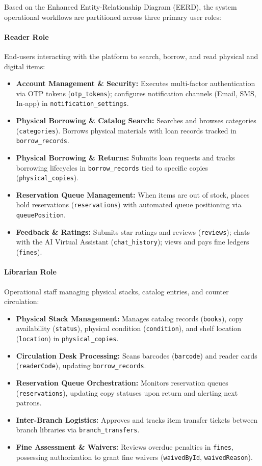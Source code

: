 Based on the Enhanced Entity-Relationship Diagram (EERD), the system operational workflows are partitioned across three primary user roles:

\paragraph{Reader Role}
End-users interacting with the platform to search, borrow, and read physical and digital items:
\begin{itemize}
	\item \textbf{Account Management \& Security:} Executes multi-factor authentication via OTP tokens (\texttt{otp\_tokens}); configures notification channels (Email, SMS, In-app) in \texttt{notification\_settings}.
	\item \textbf{Physical Borrowing \& Catalog Search:} Searches and browses categories (\texttt{categories}). Borrows physical materials with loan records tracked in \texttt{borrow\_records}.
	\item \textbf{Physical Borrowing \& Returns:} Submits loan requests and tracks borrowing lifecycles in \texttt{borrow\_records} tied to specific copies (\texttt{physical\_copies}).
	\item \textbf{Reservation Queue Management:} When items are out of stock, places hold reservations (\texttt{reservations}) with automated queue positioning via \texttt{queuePosition}.
	\item \textbf{Feedback \& Ratings:} Submits star ratings and reviews (\texttt{reviews}); chats with the AI Virtual Assistant (\texttt{chat\_history}); views and pays fine ledgers (\texttt{fines}).
\end{itemize}

\paragraph{Librarian Role}
Operational staff managing physical stacks, catalog entries, and counter circulation:
\begin{itemize}
	\item \textbf{Physical Stack Management:} Manages catalog records (\texttt{books}), copy availability (\texttt{status}), physical condition (\texttt{condition}), and shelf location (\texttt{location}) in \texttt{physical\_copies}.
	\item \textbf{Circulation Desk Processing:} Scans barcodes (\texttt{barcode}) and reader cards (\texttt{readerCode}), updating \texttt{borrow\_records}.
	\item \textbf{Reservation Queue Orchestration:} Monitors reservation queues (\texttt{reservations}), updating copy statuses upon return and alerting next patrons.
	\item \textbf{Inter-Branch Logistics:} Approves and tracks item transfer tickets between branch libraries via \texttt{branch\_transfers}.
	\item \textbf{Fine Assessment \& Waivers:} Reviews overdue penalties in \texttt{fines}, possessing authorization to grant fine waivers (\texttt{waivedById}, \texttt{waivedReason}).
\end{itemize}

